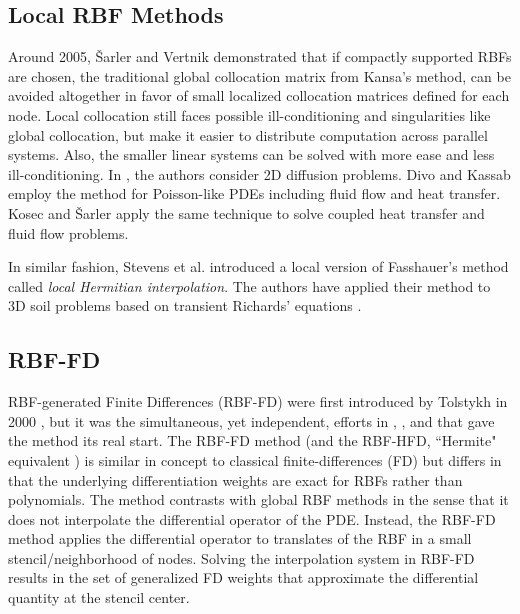 \documentclass{report}
\begin{document}
{\subsection{Local RBF Methods}
Around 2005, \v{S}arler and Vertnik \cite{Sarler2006, Vertnik2006} demonstrated that if compactly supported RBFs are chosen, the traditional global 
collocation matrix from Kansa's method, can be avoided altogether in favor of small localized collocation matrices defined for 
each node. Local collocation still faces possible ill-conditioning and singularities 
like global collocation, but make it easier to distribute computation across parallel systems. Also, the smaller linear systems can be 
solved 
with more ease and less ill-conditioning. In \cite{Sarler2006}, the authors consider 2D diffusion problems. Divo and Kassab \cite{Divo2007} 
employ the 
method for Poisson-like PDEs including fluid flow and heat transfer. Kosec and \v{S}arler \cite{Kosec2008} apply the 
same technique to solve coupled heat transfer and fluid flow problems.

In similar fashion, Stevens et al. \cite{Stevens2009a} introduced a local version of 
Fasshauer's method called \emph{local Hermitian interpolation}. The authors have applied their method to 3D soil 
problems based on transient Richards' equations \cite{Stevens2008a, Stevens2009a, Stevens2009b}.

\subsection{RBF-FD}

RBF-generated Finite Differences (RBF-FD) were first introduced by Tolstykh in 2000 \cite{Tolstykh2000}, 
but it was the simultaneous, yet independent,
efforts in \cite{Shu2003}, \cite{Tolstykh2003a}, \cite{Wright2003} and \cite{Cecil2004} that gave the method its real start. 
The RBF-FD method (and the RBF-HFD, ``Hermite" equivalent \cite{WrightFornberg06}) is similar in concept to classical 
finite-differences (FD) but differs in that the underlying differentiation 
weights are exact for RBFs rather than polynomials. The method contrasts with global RBF methods in the sense that it does not interpolate the differential operator of the PDE. Instead, the RBF-FD method applies the differential operator to translates of the RBF in a small stencil/neighborhood of nodes. Solving the interpolation system in RBF-FD results in the set of generalized FD weights that approximate the differential quantity at the stencil center.

}
\end{document}
